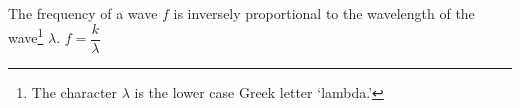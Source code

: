 {The frequency of a wave $f$ is inversely proportional to the wavelength of the wave\footnote{The character $\lambda$ is the lower case Greek letter `lambda.'}  $\lambda$.}
{$f = \dfrac{k}{\lambda}$}